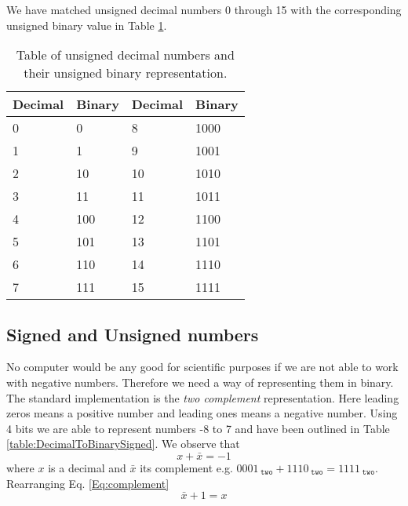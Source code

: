     We have matched unsigned decimal numbers 0 through 15 with the corresponding unsigned binary value in Table \ref{table:DecimalToBinaryUnsigned}.
    
    \begin{table}[h!]
        \centering
        \begin{tabular}{|l|l||l|l|}
        	\hline
        	Decimal & Binary & Decimal & Binary \\ \hline
        	0       & 0      & 8       & 1000   \\
        	1       & 1      & 9       & 1001   \\
        	2       & 10     & 10      & 1010   \\
        	3       & 11     & 11      & 1011   \\
        	4       & 100    & 12      & 1100   \\
        	5       & 101    & 13      & 1101   \\
        	6       & 110    & 14      & 1110   \\
        	7       & 111    & 15      & 1111   \\ \hline
        \end{tabular}
        \caption{Table of unsigned decimal numbers and their unsigned binary representation.}
        \label{table:DecimalToBinaryUnsigned}
    \end{table} 
    
    \subsection{Signed and Unsigned numbers}
        No computer would be any good for scientific purposes if we are not able to work with negative numbers. Therefore we need a way of representing them in binary. The standard implementation is the \textit{two complement} representation. Here leading zeros means a positive number and leading ones means a negative number. Using 4 bits we are able to represent numbers -8 to 7 and have been outlined in Table \ref{table:DecimalToBinarySigned}. 
        We observe that 
        \begin{equation}\label{Eq:complement}
            x + \bar{x} = -1
        \end{equation}
        where $x$ is a decimal and $\bar{x}$ its complement e.g. $0001_{\; \texttt{two}}+1110_{\; \texttt{two}}=1111_{\; \texttt{two}}$. Rearranging Eq. \ref{Eq:complement}
        \begin{equation}
        \bar{x} + 1 = x
        \end{equation}
        
